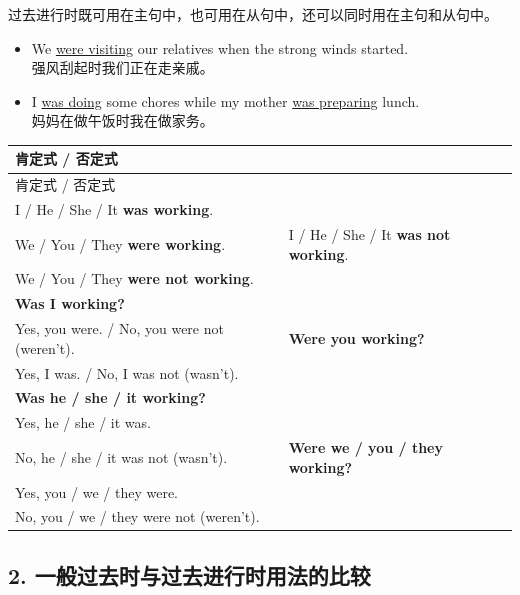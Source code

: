 \documentclass[11pt,a4paper]{ctexart}
\begin{document}
过去进行时既可用在主句中，也可用在从句中，还可以同时用在主句和从句中。

\begin{itemize}[leftmargin=1.4em]
\item We \underline{were visiting} our relatives when the strong winds started.\\ 强风刮起时我们正在走亲戚。
\item I \underline{was doing} some chores while my mother \underline{was preparing} lunch.\\ 妈妈在做午饭时我在做家务。
\end{itemize}

\begin{center}\end{center}

{\footnotesize
\begin{longtable}{p{6.70cm}p{6.70cm}}
\hline
肯定式 / 否定式 &  \\
\hline
\endfirsthead
\hline
肯定式 / 否定式 &  \\
\hline
\endhead
\hline
\endfoot
I / He / She / It \textbf{was working}.\\ We / You / They \textbf{were working}. & I / He / She / It \textbf{was not working}.\\ We / You / They \textbf{were not working}. \\
\textbf{Was I working?}\\ Yes, you were. / No, you were not (weren’t). & \textbf{Were you working?}\\ Yes, I was. / No, I was not (wasn’t). \\
\textbf{Was he / she / it working?}\\ Yes, he / she / it was.\\ No, he / she / it was not (wasn’t). & \textbf{Were we / you / they working?}\\ Yes, you / we / they were.\\ No, you / we / they were not (weren’t). \\
\end{longtable}
}

\subsection*{2. 一般过去时与过去进行时用法的比较}
\end{document}
